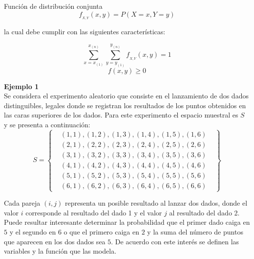 \documentclass[base=hide,12pt]{elegantbook}
\begin{document}
\begin{Box4}{Función de distribución conjunta}
$$f_{_{X,Y}}(x,y)=P(X=x,Y=y)$$

la cual debe cumplir con las siguientes características:

 $$\displaystyle\sum\limits_{x=x_{(1)}}^{x_{(n)}}\displaystyle\sum\limits_{y=y_{(1)}}^{y_{(n)}}f_{_{X,Y}}(x,y)=1$$
\vspace{.3cm}
$$f(x,y)\geq 0$$
\end{Box4}
\vspace{.5cm}
\textcolor{col3}{\bf Ejemplo 1}\\
 Se considera el experimento aleatorio que consiste en el lanzamiento de dos dados distinguibles, legales donde se registran los resultados de los puntos obtenidos 	en las caras superiores de los dados. Para este experimento el espacio muestral es $S$ y se presenta a continuación:
%
\begin{equation*}
	S=\left\{
	\begin{array}{cccccc}
		&(1,1),(1,2),(1,3),(1,4),(1,5),(1,6)&\\
		&(2,1),(2,2),(2,3),(2,4),(2,5),(2,6)&\\
		&(3,1),(3,2),(3,3),(3,4),(3,5),(3,6)&\\
		&(4,1),(4,2),(4,3),(4,4),(4,5),(4,6)&\\
		&(5,1),(5,2),(5,3),(5,4),(5,5),(5,6)&\\
		&(6,1),(6,2),(6,3),(6,4),(6,5),(6,6)&
	\end{array}
	\right\}
\end{equation*}

\vspace{.5cm}
Cada pareja $(i,j)$ representa un posible resultado al lanzar dos dados, donde el valor $i$ corresponde al resultado del dado 1 y el valor $j$ al resultado del dado 2.\\

Puede resultar interesante determinar la probabilidad que el primer dado caiga en $5$ y el segundo en $6$ o que el primero caiga en $2$ y la suma del número de puntos que aparecen  en los dos dados sea $5$. De acuerdo con este interés se definen las variables y la función que las modela.\\
\end{document}
